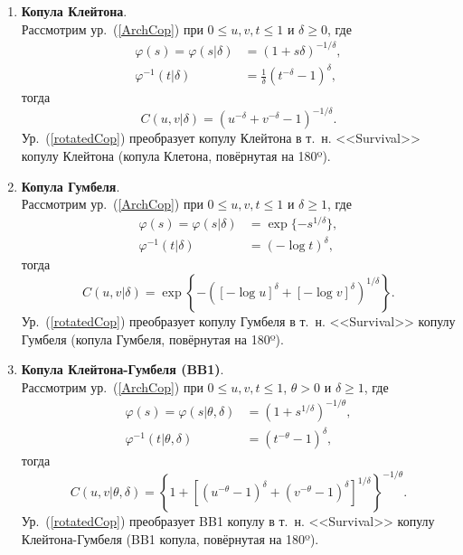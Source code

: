 \begin{enumerate}
\item \textbf{Копула Клейтона}.\\
Рассмотрим ур.~(\ref{ArchCop}) при $0 \le u,v,t \le 1$ и $\delta \ge 0$, где
\begin{equation}
\begin{aligned}
    \varphi (s) = \varphi(s| \delta) &= (1 + s \delta)^{-1/\delta}, \\ 
    \varphi^{-1}(t| \delta) &= \frac{1}{\delta} (t^{-\delta} - 1)^\delta,
\end{aligned} \nonumber 
\end{equation}
тогда
\begin{equation}
    C(u,v|\delta) = (u^{-\delta} + v^{-\delta} - 1)^{-1/\delta}. \nonumber
\end{equation}
Ур.~(\ref{rotatedCop}) преобразует копулу Клейтона в т.~н. <<Survival>> копулу Клейтона (копула Клетона, повёрнутая на 180º).

\item \textbf{Копула Гумбеля}.\\
Рассмотрим ур.~(\ref{ArchCop}) при $0 \le u,v,t \le 1$ и $\delta \ge 1$, где
\begin{equation}
\begin{aligned}
    \varphi (s) = \varphi(s| \delta) &= \exp{\{-s^{1/\delta}\}}, \\ 
    \varphi^{-1}(t| \delta) &= (-\log{t})^\delta,
\end{aligned} \nonumber 
\end{equation}
тогда
\begin{equation}
    C(u,v|\delta) = \exp{\left\{-([-\log{u}]^\delta + [-\log{v}]^\delta)^{1/\delta}\right\}}. \nonumber
\end{equation}
Ур.~(\ref{rotatedCop}) преобразует копулу Гумбеля в т.~н. <<Survival>> копулу Гумбеля (копула Гумбеля, повёрнутая на 180º). 

\item \textbf{Копула Клейтона-Гумбеля (BB1)}.\\
Рассмотрим ур.~(\ref{ArchCop}) при $0 \le u,v,t \le 1$, $\theta > 0$ и $\delta \ge 1$, где
\begin{equation}
\begin{aligned}
    \varphi (s) = \varphi(s| \theta, \delta) &= (1 + s^{1/\delta})^{-1/\theta}, \\ 
    \varphi^{-1}(t| \theta, \delta) &= (t^{-\theta} - 1)^\delta,
\end{aligned} \nonumber 
\end{equation}
тогда
\begin{equation}
    C(u,v|\theta,\delta) = \left\{1 + [(u^{-\theta} - 1)^\delta + (v^{-\theta} - 1)^\delta]^{1/\delta} \right\}^{-1/\theta}. \nonumber
\end{equation}
Ур.~(\ref{rotatedCop}) преобразует BB1 копулу в т.~н. <<Survival>> копулу Клейтона-Гумбеля (BB1 копула, повёрнутая на 180º).


\end{enumerate}
